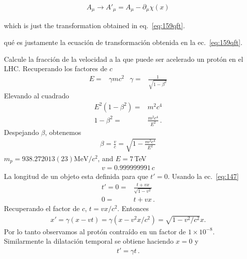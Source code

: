 \begin{align}
\label{eq:168qft}
  A_\mu\to A'_\mu=A_\mu-\partial_\mu\chi(x)
\end{align}
\begin{english}
which is just the transformation obtained in eq.~\eqref{eq:159qft}.  
\end{english}
\begin{spanish} %
qu\'e es justamente la ecuaci\'on de transformaci\'on obtenida en la ec.~\eqref{eq:159qft}.  
\end{spanish}

\begin{frame}
\begin{example}
  Calcule la fracci\'on de la velocidad a la que puede ser acelerado un prot\'on en el LHC.
Recuperando los factores de $c$
  \begin{align*}
  E=&\gamma m c^2&  \gamma=&\frac{1}{\sqrt{1-\beta^2}}
\end{align*}
Elevando al cuadrado
\begin{align}
  E^2(1-\beta^2)=&m^2c^4 \nonumber\\
1-\beta^2=&\frac{m^2c^4}{E^2}\,.
\end{align}
Despejando $\beta$, obtenemos
\begin{align*}
  \beta=\frac{v}{c}=\sqrt{1-\frac{m^2 c^4}{E^2}}
\end{align*}
$m_p=938.272013(23) {\text{MeV}}/{c^2}$, and $E=7\,$TeV
\begin{align*}
  v=0.999999991\,c
\end{align*}
La longitud de un objeto esta definida para que $t'=0$. Usando la ec.~\eqref{eq:147} 
\begin{align}
  t'=0=&\frac{t+vx}{\sqrt{1-v^2}} \nonumber\\
     0=&t+vx\,.
\end{align}
Recuperando el factor de $c$,
 $t=v x/c^2$. Entonces
\begin{align}
  x'=\gamma(x-v t)=\gamma(x-v^2 x/c^2)=\sqrt{1-v^2/c^2}x.
\end{align}
Por lo tanto observamos al protón contraído en un factor de $1\times10^{-8}$.  Similarmente la dilataci\'on temporal se obtiene haciendo $x=0$ y
\begin{align}
  t'=\gamma t\,.
\end{align}
\end{example}

\end{frame}

